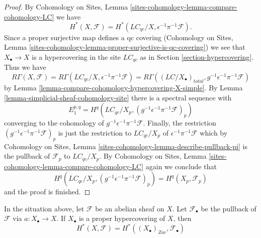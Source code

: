 \begin{proof}
By Cohomology on Sites, Lemma
\ref{sites-cohomology-lemma-compare-cohomology-LC}
we have
$$
H^*(X, \mathcal{F}) =
H^*(\textit{LC}_{qc}/X, \epsilon^{-1}\pi^{-1}\mathcal{F}).
$$
Since a proper surjective map defines a qc covering
(Cohomology on Sites, Lemma
\ref{sites-cohomology-lemma-proper-surjective-is-qc-covering})
we see that $X_\bullet \to X$ is a hypercovering in the site
$\textit{LC}_{qc}$ as in
Section \ref{section-hypercovering}.
Thus we have
$$
R\Gamma(X, \mathcal{F}) =
R\Gamma(\textit{LC}_{qc}/X, \epsilon^{-1}\pi^{-1}\mathcal{F}) =
R\Gamma((\textit{LC}/X_\bullet)_{total}, g^{-1}\epsilon^{-1}\pi^{-1}\mathcal{F})
$$
by Lemma \ref{lemma-compare-cohomology-hypercovering-X-simple}.
By Lemma \ref{lemma-simplicial-sheaf-cohomology-site}
there is a spectral sequence with
$$
E_1^{p, q} =
H^q(\textit{LC}_{qc}/X_p, (g^{-1}\epsilon^{-1}\pi^{-1}\mathcal{F})_p)
$$
converging to the cohomology of $g^{-1}\epsilon^{-1}\pi^{-1}\mathcal{F}$.
Finally, the restriction $(g^{-1}\epsilon^{-1}\pi^{-1}\mathcal{F})_p$
is just the restriction to $\textit{LC}_{qc}/X_p$ of
$\epsilon^{-1}\pi^{-1}\mathcal{F}$ which by
Cohomology on Sites, Lemma \ref{sites-cohomology-lemma-describe-pullback-pi}
is the pullback of $\mathcal{F}_p$ to $\textit{LC}_{qc}/X_p$.
By Cohomology on Sites, Lemma
\ref{sites-cohomology-lemma-compare-cohomology-LC}
again we conclude that
$$
H^q(\textit{LC}_{qc}/X_p, (g^{-1}\epsilon^{-1}\pi^{-1}\mathcal{F})_p)
= H^q(X_p, \mathcal{F}_p)
$$
and the proof is finished.
\end{proof}

\begin{lemma}
\label{lemma-compute-via-proper-hypercovering}
In the situation above, let $\mathcal{F}$ be an abelian sheaf on $X$.
Let $\mathcal{F}_\bullet$ be the pullback of $\mathcal{F}$ via
$a : X_\bullet \to X$. If $X_\bullet$ is a proper hypercovering
of $X$, then
$$
H^*(X, \mathcal{F}) = H^*((X_\bullet)_{Zar}, \mathcal{F}_\bullet)
$$
\end{lemma}

